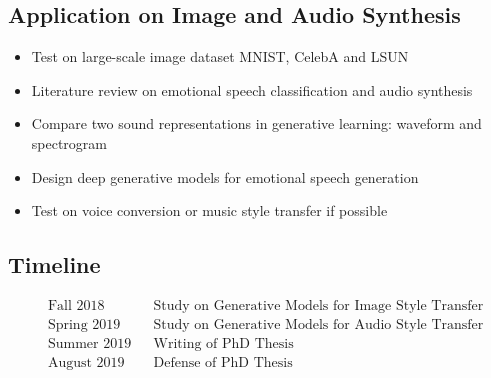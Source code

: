 \documentclass{article}
\begin{document}
\subsection{Application on Image and Audio Synthesis}
\begin{itemize}
\item Test on large-scale image dataset MNIST, CelebA and LSUN
\item Literature review on emotional speech classification and audio synthesis
\item Compare two sound representations in generative learning: waveform and spectrogram
\item Design deep generative models for emotional speech generation
\item Test on voice conversion or music style transfer if possible
\end{itemize}


\subsection{Timeline}
\begin{align*}
&\text{Fall 2018} && \text{Study on Generative Models for Image Style Transfer} \\
&\text{Spring 2019} && \text{Study on Generative Models for Audio Style Transfer} \\
&\text{Summer 2019} && \text{Writing of PhD Thesis} \\
&\text{August 2019} && \text{Defense of PhD Thesis}
\end{align*}


\end{document}
